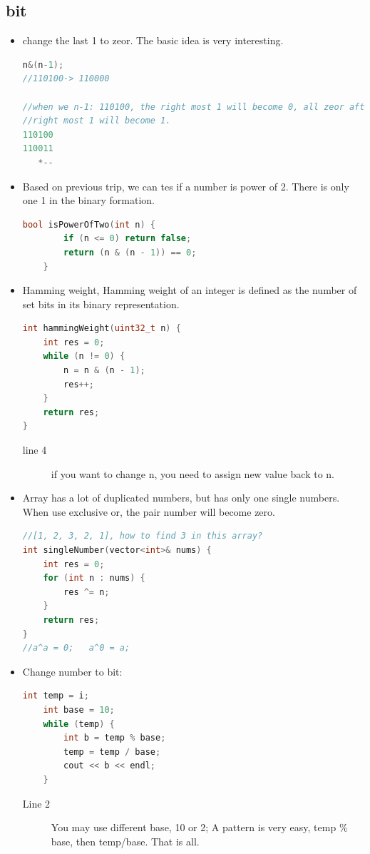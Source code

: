\documentclass[a4paper,11pt,twoside]{book}
\begin{document}
\subsection{bit}
\begin{itemize}
	\item change the last 1 to zeor. The basic idea is very interesting. 
\begin{lstlisting}[frame=single, language=c++]	
n&(n-1);
//110100-> 110000

//when we n-1: 110100, the right most 1 will become 0, all zeor after 
//right most 1 will become 1. 
110100
110011
   *--
\end{lstlisting}

	\item Based on previous trip, we can tes if a number is power of 2. There is only one 1 in the binary formation.
\begin{lstlisting}[frame=single, language=c++]	
	bool isPowerOfTwo(int n) {
		if (n <= 0) return false;
		return (n & (n - 1)) == 0;
	}
\end{lstlisting}

	\item Hamming weight,  Hamming weight of an integer is defined as the number of set bits in its binary representation. 
\begin{lstlisting}[frame=single, language=c++]	
int hammingWeight(uint32_t n) {
	int res = 0;
	while (n != 0) {
		n = n & (n - 1);
		res++;
	}
	return res;
}
\end{lstlisting}
\begin{description}
	\item[line 4] if you want to change n, you need to assign new value back to n. 
\end{description}

	
	\item Array has a lot of duplicated numbers, but has only one single numbers.  When use exclusive or, the pair number will become zero.
\begin{lstlisting}[frame=single, language=c++]	
//[1, 2, 3, 2, 1], how to find 3 in this array? 
int singleNumber(vector<int>& nums) {
	int res = 0;
	for (int n : nums) {
		res ^= n;
	}
	return res;
}
//a^a = 0;   a^0 = a;
\end{lstlisting}

	\item Change number to bit: 
\begin{lstlisting}[frame=single, language=c++]	
	int temp = i;
	int base = 10;
	while (temp) {
		int b = temp % base;
		temp = temp / base;
		cout << b << endl;
	}
\end{lstlisting}	
\begin{description}
	\item[Line 2] You may use different base, 10 or 2;	A pattern is very easy, temp \% base, then temp/base. That is all. 
\end{description}	
	

\end{itemize}
\end{document}
